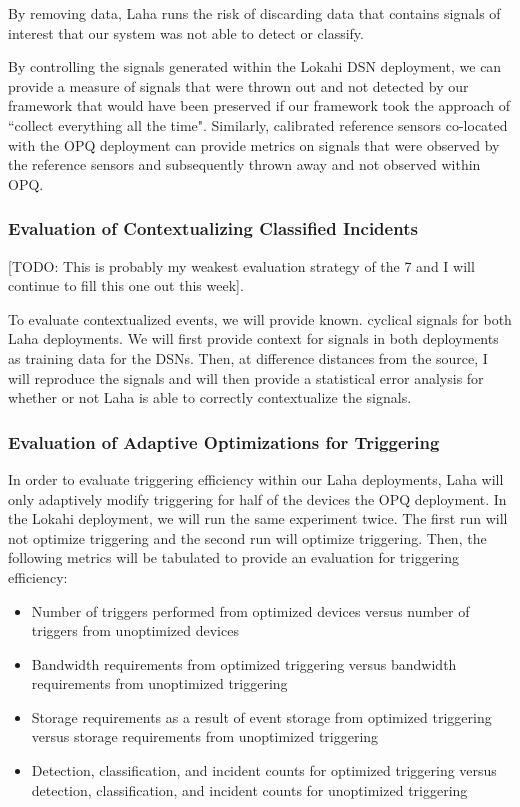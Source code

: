 By removing data, Laha runs the risk of discarding data that contains signals of interest that our system was not able to detect or classify. 

By controlling the signals generated within the Lokahi DSN deployment, we can provide a measure of signals that were thrown out and not detected by our framework that would have been preserved if our framework took the approach of ``collect everything all the time". Similarly, calibrated reference sensors co-located with the OPQ deployment can provide metrics on signals that were observed by the reference sensors and subsequently thrown away and not observed within OPQ.

\subsubsection{Evaluation of Contextualizing Classified Incidents}
[TODO: This is probably my weakest evaluation strategy of the 7 and I will continue to fill this one out this week].

To evaluate contextualized events, we will provide known. cyclical signals for both Laha deployments. We will first provide context for signals in both deployments as training data for the DSNs. Then, at difference distances from the source, I will reproduce the signals and will then provide a statistical error analysis for whether or not Laha is able to correctly contextualize the signals.

\subsubsection{Evaluation of Adaptive Optimizations for Triggering}
In order to evaluate triggering efficiency within our Laha deployments, Laha will only adaptively modify triggering for half of the devices the OPQ deployment. In the Lokahi deployment, we will run the same experiment twice. The first run will not optimize triggering and the second run will optimize triggering. Then, the following metrics will be tabulated to provide an evaluation for triggering efficiency:

\begin{itemize}
	\item Number of triggers performed from optimized devices versus number of triggers from  unoptimized devices
	\item Bandwidth requirements from optimized triggering versus bandwidth requirements from unoptimized triggering
	\item Storage requirements as a result of event storage from optimized triggering versus storage requirements from unoptimized triggering
	\item Detection, classification, and incident counts for optimized triggering versus detection, classification, and incident counts for unoptimized triggering
\end{itemize}

